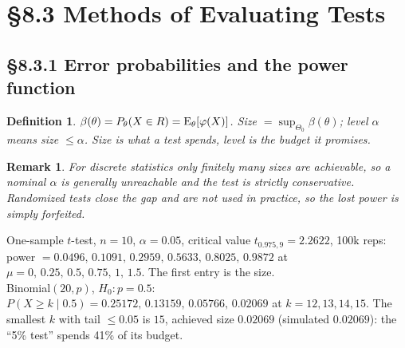 \documentclass[11pt]{article}
\newtheorem{definition}[theorem]{Definition}
\newtheorem{remark}[theorem]{Remark}
\begin{document}
\section{\S8.3 Methods of Evaluating Tests}
\subsection{\S8.3.1 Error probabilities and the power function}
\begin{definition}
$\beta(\theta)=P_\theta(X\in R)=\operatorname{E}_\theta[\varphi(X)]$. Size $=\sup_{\Theta_0}\beta(\theta)$; level $\alpha$ means size $\le\alpha$. Size is what a test spends, level is the budget it promises.
\end{definition}
\begin{remark}
For discrete statistics only finitely many sizes are achievable, so a nominal $\alpha$ is generally unreachable and the test is strictly conservative. Randomized tests close the gap and are not used in practice, so the lost power is simply forfeited.
\end{remark}
\begin{simbox}
One-sample $t$-test, $n=10$, $\alpha=0.05$, critical value $t_{0.975,9}=2.2622$, 100k reps: power $=0.0496,\,0.1091,\,0.2959,\,0.5633,\,0.8025,\,0.9872$ at $\mu=0,\,0.25,\,0.5,\,0.75,\,1,\,1.5$. The first entry is the size.\\
Binomial$(20,p)$, $H_0:p=0.5$: $P(X\ge k\mid0.5)=0.25172,\,0.13159,\,0.05766,\,0.02069$ at $k=12,13,14,15$. The smallest $k$ with tail $\le0.05$ is $15$, achieved size $0.02069$ (simulated $0.02069$): the ``5\% test'' spends 41\% of its budget.
\end{simbox}
\end{document}
